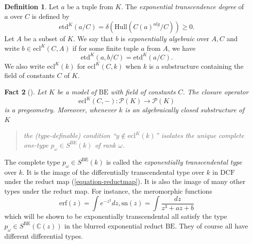 \documentclass[12pt]{amsart}
\newcommand{\DCF}{\mathrm{DCF}}
\newcommand{\BE}{\mathrm{BE}}
\theoremstyle{definition}
\newtheorem{defn}{Definition}[section]
\theoremstyle{plain}
\newtheorem{fact}[defn]{Fact}
\theoremstyle{exampstyle}\newtheorem{thmx}{Theorem}
\theoremstyle{exampstyle}\newtheorem{thmxbis}{Theorem}
\begin{document}
\begin{defn} 
Let $a$ be a tuple from $K$. The {\em exponential transcendence degree} of $a$ over $C$ is defined by
$$ \mathrm{etd}^K(a/C) = \delta(\mathrm{Hull}(C(a)^{alg}/C)) \geq 0.$$
Let $A$ be a subset of $K$. We say that $b$ is {\em exponentially algebraic} over $A,C$  and write $b \in \mathrm{ecl}^K(C,A)$ if for some finite tuple $a$ from $A$, we have  
$$ \mathrm{etd}^K(a,b/C) = \mathrm{etd}^K(a/C).$$ 
We also write $\mathrm{ecl}^K(k)$ for $\mathrm{ecl}^K(C,k)$ when $k$ is a substructure containing the field of constants $C$ of $K$.
\end{defn}


\begin{fact}[{\citep[Section 2.7]{Kirby-semiab}}]\label{fact-pregeometry}
Let $K$ be a model of $\BE$ with field of constants $C$. The closure operator
$$\mathrm{ecl}^K(C, -) : \mathcal P(K) \rightarrow \mathcal P(K)$$ is a pregeometry. Moreover, whenever $k$ is an algebraically closed substructure of $K$
\begin{quote}
the (type-definable) condition ``$y \notin \mathrm{ecl}^K(k)$'' isolates the unique complete one-type $p_\omega \in S^{\BE}(k)$ of rank $\omega$.
\end{quote}
\end{fact} 

The complete type $p_\omega \in S^{\BE}(k)$ is called the {\em exponentially transcendental type} over $k$. It is the image of the differentially transcendental type over  $k$ in $\DCF$ under the reduct map (\ref{equation-reductmap}). It is also the image of many other types under the reduct map. For instance, the meromorphic functions
$$ \mathrm{erf}(z) = \int e^{-z^2}dz, \mathrm{sn}(z) =  \int \frac{dz}{z^3 + az + b}$$
which will be shown to be exponentially transcendental all satisfy the type $p_\omega \in S^{\BE}(\mathbb{C}(z))$ in the blurred exponential reduct $\BE$. They of course all have different differential types. 
\end{document}
